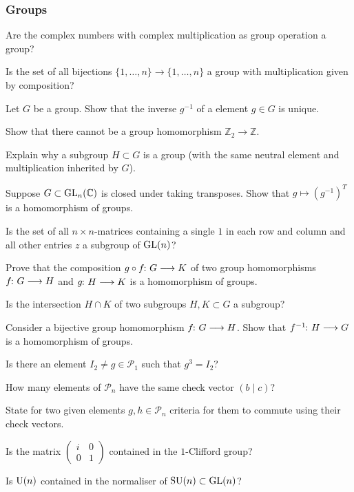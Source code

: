 \documentclass[a4paper, oneside, 12pt]{amsart}
\newcommand*{\PauliGroup}{\ensuremath{\mathcal{P}}}
\begin{document}
\subsubsection*{Groups}
\begin{thmlist}
  \item Are the complex numbers with complex multiplication as group operation a group?
  \item Is the set of all bijections \(\{1, \dots , n\}\to\{1, \dots , n\}\) a group with multiplication given by composition?
  \item Let \(G\) be a group. Show that the inverse \(g^{-1}\) of a element \(g\in G\) is unique.
  \item Show that there cannot be a group homomorphism \( \mathbb{Z}_{2} \to \mathbb{Z}\).
  \item Explain why a subgroup \(H\subset G\) is a group (with the same neutral element and multiplication inherited by \(G\)).
  \item Suppose \(G\subset \operatorname{GL}_{n}( \mathbb{C})\) is closed under taking transposes.
  Show that  \(g \mapsto (g^{-1})^{T} \) is a homomorphism of groups.
  \item Is the set of all \(n\times n\)-matrices containing a single \(1\) in each row and column and all other entries \(z\) a subgroup of \(\operatorname{GL}(n)\)?
  \item Prove that the composition \(g\circ f \from G \to K\) of two group homomorphisms \(f \from G \to H\) and \(g \from H \to K \) is a homomorphism of groups.
  \item Is the intersection \(H\cap K\) of two subgroups \(H,K \subset G\) a subgroup?
  \item Consider a bijective group homomorphism \(f\from G\to H\). Show that \(f^{-1} \from H \to G\) is a homomorphism of groups.
  \item Is there an element \(I_{2}\neq g\in \PauliGroup_{1}\) such that \(g^{3}= I_{2}\)?
  \item How many elements of \(\PauliGroup_{n}\) have the same check vector \((b \mid c)\)?
  \item State for two given elements \(g,h \in \PauliGroup_{n}\) criteria for them to commute using their check vectors.
  \item Is the matrix \(
  \begin{pmatrix}
    i & 0 \\ 0 & 1
  \end{pmatrix}
  \) contained in the \(1\)-Clifford group?
  \item Is \(\operatorname{U}(n)\) contained in the normaliser of \(\operatorname{SU}(n) \subset \operatorname{GL}(n)\)?
\end{thmlist}
\end{document}
